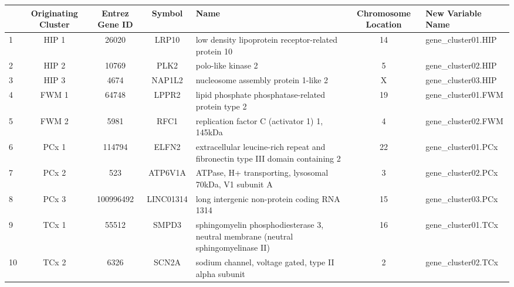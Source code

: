\begin{table}[ht]
\centering
\begin{tabular}{l|c|c|c|l|c|l}
  \hline
 & Originating Cluster & Entrez Gene ID & Symbol & Name & Chromosome Location & New Variable Name \\ 
  \hline
1 & HIP 1 & 26020 & LRP10 & low density lipoprotein receptor-related protein 10 & 14 & gene\_cluster01.HIP \\ 
  2 & HIP 2 & 10769 & PLK2 & polo-like kinase 2 & 5 & gene\_cluster02.HIP \\ 
  3 & HIP 3 & 4674 & NAP1L2 & nucleosome assembly protein 1-like 2 & X & gene\_cluster03.HIP \\ 
  4 & FWM 1 & 64748 & LPPR2 & lipid phosphate phosphatase-related protein type 2 & 19 & gene\_cluster01.FWM \\ 
  5 & FWM 2 & 5981 & RFC1 & replication factor C (activator 1) 1, 145kDa & 4 & gene\_cluster02.FWM \\ 
  6 & PCx 1 & 114794 & ELFN2 & extracellular leucine-rich repeat and fibronectin type III domain containing 2 & 22 & gene\_cluster01.PCx \\ 
  7 & PCx 2 & 523 & ATP6V1A & ATPase, H+ transporting, lysosomal 70kDa, V1 subunit A & 3 & gene\_cluster02.PCx \\ 
  8 & PCx 3 & 100996492 & LINC01314 & long intergenic non-protein coding RNA 1314 & 15 & gene\_cluster03.PCx \\ 
  9 & TCx 1 & 55512 & SMPD3 & sphingomyelin phosphodiesterase 3, neutral membrane (neutral sphingomyelinase II) & 16 & gene\_cluster01.TCx \\ 
  10 & TCx 2 & 6326 & SCN2A & sodium channel, voltage gated, type II alpha subunit & 2 & gene\_cluster02.TCx \\ 
   \hline
\end{tabular}
\end{table}
